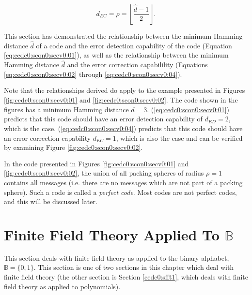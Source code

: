 \begin{equation}
\label{eq:cedc0:scon0:secv0:04}
d_{EC} = \rho = \left\lfloor {\frac{\hat{d}-1}{2}} \right\rfloor .
\end{equation}

This section has demonstrated the relationship between the minimum Hamming
distance $\hat{d}$ of a code and the error detection capability of the code
(Equation \ref{eq:cedc0:scon0:secv0:01}), as well as the relationship between the
minimum Hamming
distance $\hat{d}$ and the error correction capabilility 
(Equations \ref{eq:cedc0:scon0:secv0:02} through 
\ref{eq:cedc0:scon0:secv0:04}).

Note that the relationships derived do apply to the example presented in 
Figures \ref{fig:cedc0:scon0:secv0:01} and \ref{fig:cedc0:scon0:secv0:02}.
The code shown in the figures has a minimum Hamming distance $\hat{d}=3$.
(\ref{eq:cedc0:scon0:secv0:01}) predicts that this code should have
an error detection capability of $d_{ED}=2$, which is the case.  
(\ref{eq:cedc0:scon0:secv0:04}) predicts that this code should have an error correction
capability $d_{EC}=1$, which is also the case and can be verified by
examining Figure \ref{fig:cedc0:scon0:secv0:02}.

In the code presented in Figures \ref{fig:cedc0:scon0:secv0:01} and 
\ref{fig:cedc0:scon0:secv0:02}, the union of all packing spheres of radius 
$\rho=1$ contains all messages (i.e. there are no messages which are not part of
a packing sphere).  Such a code is called a \emph{perfect code}.  Most codes
are not perfect codes, and this will be discussed later.


\section[Finite Field Theory Applied To \protect\mbox{\protect$\mathbb{B}$}]
        {Finite Field Theory Applied To \protect\mbox{\protect\boldmath$\mathbb{B}$}}
\label{cedc0:sfft0}

This 
section  deals with finite field 
theory as applied to the binary alphabet,
$\mathbb{B} = \{ 0, 1 \}$.
This section is one of two sections in this chapter which deal with 
finite field theory 
(the other section is Section \ref{cedc0:sfft1},
which deals with finite field theory as applied to polynomials).  


